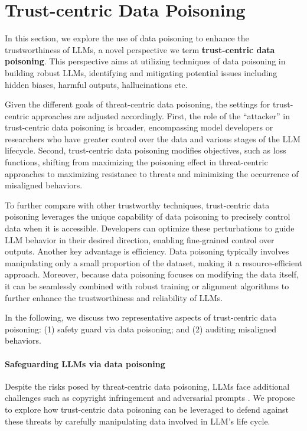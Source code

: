 \section{Trust-centric Data Poisoning} \label{section:trust}

In this section, we explore the use of data poisoning to enhance the trustworthiness of LLMs, a novel perspective we term \textbf{trust-centric data poisoning}. This perspective aims at utilizing techniques of data poisoning in building robust LLMs, identifying and mitigating potential issues including hidden biases, harmful outputs,  hallucinations etc.

Given the different goals of threat-centric data poisoning, the settings for trust-centric approaches are adjusted accordingly. First, the role of the ``attacker'' in trust-centric data poisoning is broader, encompassing model developers or researchers who have greater control over the data and various stages of the LLM lifecycle. Second, trust-centric data poisoning modifies objectives, such as loss functions, shifting from maximizing the poisoning effect in threat-centric approaches to maximizing resistance to threats and minimizing the occurrence of misaligned behaviors.

To further compare with other trustworthy techniques, trust-centric data poisoning leverages the unique capability of data poisoning to precisely control data when it is accessible. Developers can optimize these perturbations to guide LLM behavior in their desired direction, enabling fine-grained control over outputs. Another key advantage is efficiency. Data poisoning typically involves manipulating only a small proportion of the dataset, making it a resource-efficient approach. Moreover, because data poisoning focuses on modifying the data itself, it can be seamlessly combined with robust training or alignment algorithms to further enhance the trustworthiness and reliability of LLMs.


In the following, we discuss two representative aspects of trust-centric data poisoning: (1) safety guard via data poisoning; and (2) auditing misaligned behaviors.  

\paragraph{Safeguarding LLMs via data poisoning}\label{section:safeguard}
Despite the risks posed by threat-centric data poisoning, LLMs face additional challenges such as copyright infringement \citep{samuelson2023generative, bommasani2021opportunities, ren2024copyright} and adversarial prompts \citep{zou2023universal, lin2024towards, chao2023jailbreaking}. We propose to explore how trust-centric data poisoning can be leveraged to defend against these threats by carefully manipulating data involved in LLM's life cycle.

